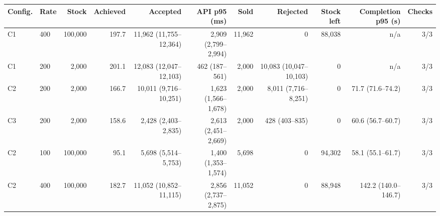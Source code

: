 \begin{tabular}{llrrrrrrrrr}
\toprule
Config. & Rate & Stock & Achieved & Accepted & API p95 (ms) & Sold & Rejected & Stock left & Completion p95 (s) & Checks \\
\midrule
C1 & 400 & 100,000 & 197.7 & 11,962 (11,755--12,364) & 2,909 (2,799--2,994) & 11,962 & 0 & 88,038 & n/a & 3/3 \\
C1 & 200 & 2,000 & 201.1 & 12,083 (12,047--12,103) & 462 (187--561) & 2,000 & 10,083 (10,047--10,103) & 0 & n/a & 3/3 \\
C2 & 200 & 2,000 & 166.7 & 10,011 (9,716--10,251) & 1,623 (1,566--1,678) & 2,000 & 8,011 (7,716--8,251) & 0 & 71.7 (71.6--74.2) & 3/3 \\
C3 & 200 & 2,000 & 158.6 & 2,428 (2,403--2,835) & 2,613 (2,451--2,669) & 2,000 & 428 (403--835) & 0 & 60.6 (56.7--60.7) & 3/3 \\
\addlinespace[2pt]
C2 & 100 & 100,000 & 95.1 & 5,698 (5,514--5,753) & 1,400 (1,353--1,574) & 5,698 & 0 & 94,302 & 58.1 (55.1--61.7) & 3/3 \\
C2 & 400 & 100,000 & 182.7 & 11,052 (10,852--11,115) & 2,856 (2,737--2,875) & 11,052 & 0 & 88,948 & 142.2 (140.0--146.7) & 3/3 \\
\bottomrule
\end{tabular}
